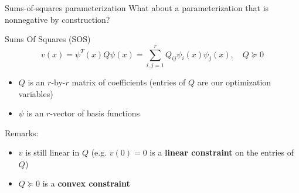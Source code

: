 \documentclass[aspectratio=169]{beamer}
\begin{document}

\begin{frame}{Sums-of-squares parameterization}
What about a parameterization that is nonnegative by construction?
\begin{block}{Sums Of Squares (SOS)}
$$
v(x) = \psi^T(x) Q \psi(x) = \sum_{i,j=1}^r Q_{ij}\psi_i(x) \psi_j(x), \quad Q \succeq 0
$$
\begin{itemize}
\item
$Q$ is an $r$-by-$r$ matrix of coefficients (entries of $Q$ are our optimization variables)
\item
$\psi$ is an $r$-vector of basis functions
\end{itemize}
\end{block}
Remarks:
\begin{itemize}
\item
$v$ is still linear in $Q$ (e.g. $v(0) = 0$ is a \textbf{linear constraint} on the entries of $Q$)
\item
$Q \succeq 0$ is a \textbf{convex constraint}
\end{itemize}
\end{frame}
\end{document}
